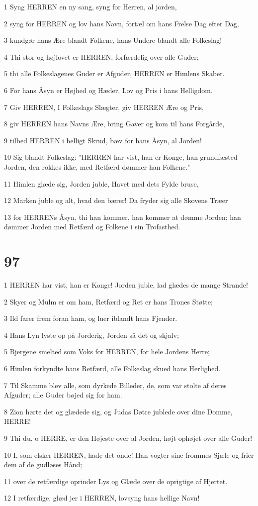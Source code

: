 \par 1 Syng HERREN en ny sang, syng for Herren, al jorden,
\par 2 syng for HERREN og lov hans Navn, fortæl om hans Frelse Dag efter Dag,
\par 3 kundgør hans Ære blandt Folkene, hans Undere blandt alle Folkeslag!
\par 4 Thi stor og højlovet er HERREN, forfærdelig over alle Guder;
\par 5 thi alle Folkeslagenes Guder er Afguder, HERREN er Himlens Skaber.
\par 6 For hans Åsyn er Højhed og Hæder, Lov og Pris i hans Helligdom.
\par 7 Giv HERREN, I Folkeslags Slægter, giv HERREN Ære og Pris,
\par 8 giv HERREN hans Navns Ære, bring Gaver og kom til hans Forgårde,
\par 9 tilbed HERREN i helligt Skrud, bæv for hans Åsyn, al Jorden!
\par 10 Sig blandt Folkeslag: "HERREN har vist, han er Konge, han grundfæsted Jorden, den rokkes ikke, med Retfærd dømmer han Folkene."
\par 11 Himlen glæde sig, Jorden juble, Havet med dets Fylde bruse,
\par 12 Marken juble og alt, hvad den bærer! Da fryder sig alle Skovens Træer
\par 13 for HERRENs Åsyn, thi han kommer, han kommer at dømme Jorden; han dømmer Jorden med Retfærd og Folkene i sin Trofasthed.

\chapter{97}

\par 1 HERREN har vist, han er Konge! Jorden juble, lad glædes de mange Strande!
\par 2 Skyer og Mulm er om ham, Retfærd og Ret er hans Trones Støtte;
\par 3 Ild farer frem foran ham, og luer iblandt hans Fjender.
\par 4 Hans Lyn lyste op på Jorderig, Jorden så det og skjalv;
\par 5 Bjergene smelted som Voks for HERREN, for hele Jordens Herre;
\par 6 Himlen forkyndte hans Retfærd, alle Folkeslag skued hans Herlighed.
\par 7 Til Skamme blev alle, som dyrkede Billeder, de, som var stolte af deres Afguder; alle Guder bøjed sig for ham.
\par 8 Zion hørte det og glædede sig, og Judas Døtre jublede over dine Domme, HERRE!
\par 9 Thi du, o HERRE, er den Højeste over al Jorden, højt ophøjet over alle Guder!
\par 10 I, som elsker HERREN, hade det onde! Han vogter sine frommes Sjæle og frier dem af de gudløses Hånd;
\par 11 over de retfærdige oprinder Lys og Glæde over de oprigtige af Hjertet.
\par 12 I retfærdige, glæd jer i HERREN, lovsyng hans hellige Navn!

